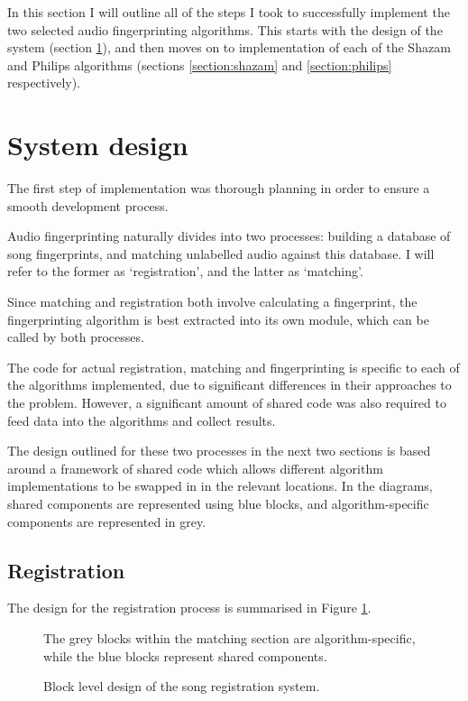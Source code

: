 \documentclass[12pt,a4paper,twoside,openright]{report}
\begin{document}
In this section I will outline all of the steps I took to successfully implement the two selected audio fingerprinting algorithms. This starts with the design of the system (section \ref{section:systemdesign}), and then moves on to implementation of each of the Shazam and Philips algorithms (sections \ref{section:shazam} and \ref{section:philips} respectively).


\section{System design}
\label{section:systemdesign}

The first step of implementation was thorough planning in order to ensure a smooth development process. 

Audio fingerprinting naturally divides into two processes: building a database of song fingerprints, and matching unlabelled audio against this database. I will refer to the former as `registration', and the latter as `matching'.

Since matching and registration both involve calculating a fingerprint, the fingerprinting algorithm is best extracted into its own module, which can be called by both processes.

The code for actual registration, matching and fingerprinting is specific to each of the algorithms implemented, due to significant differences in their approaches to the problem. However, a significant amount of shared code was also required to feed data into the algorithms and collect results.

The design outlined for these two processes in the next two sections is based around a framework of shared code which allows different algorithm implementations to be swapped in in the relevant locations. In the diagrams, shared components are represented using blue blocks, and algorithm-specific components are represented in grey. 


\subsection{Registration}

The design for the registration process is summarised in Figure \ref{figs:registration_design}. 

\begin{figure}[h]
  \centering
  
  \caption{Block level design of the song registration system.}
  \label{figs:registration_design}
  \medskip \small
  The grey blocks within the matching section are algorithm-specific, while the blue blocks represent shared components.
\end{figure}
\end{document}
